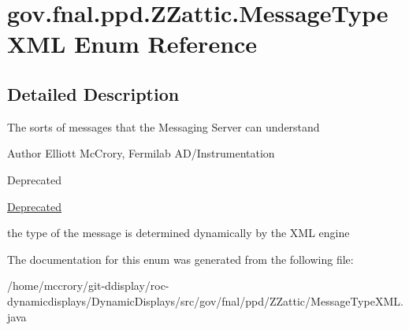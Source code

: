 \hypertarget{enumgov_1_1fnal_1_1ppd_1_1ZZattic_1_1MessageTypeXML}{\section{gov.\-fnal.\-ppd.\-Z\-Zattic.\-Message\-Type\-X\-M\-L Enum Reference}
\label{enumgov_1_1fnal_1_1ppd_1_1ZZattic_1_1MessageTypeXML}
}


\subsection{Detailed Description}
The sorts of messages that the Messaging Server can understand

\begin{DoxyAuthor}{Author}
Elliott Mc\-Crory, Fermilab A\-D/\-Instrumentation 
\end{DoxyAuthor}
\begin{DoxyRefDesc}{Deprecated}
\item[\hyperlink{deprecated__deprecated000020}{Deprecated}]
\begin{DoxyItemize}
\item the type of the message is determined dynamically by the X\-M\-L engine 
\end{DoxyItemize}\end{DoxyRefDesc}


The documentation for this enum was generated from the following file\-:\begin{DoxyCompactItemize}
\item 
/home/mccrory/git-\/ddisplay/roc-\/dynamicdisplays/\-Dynamic\-Displays/src/gov/fnal/ppd/\-Z\-Zattic/Message\-Type\-X\-M\-L.\-java\end{DoxyCompactItemize}

